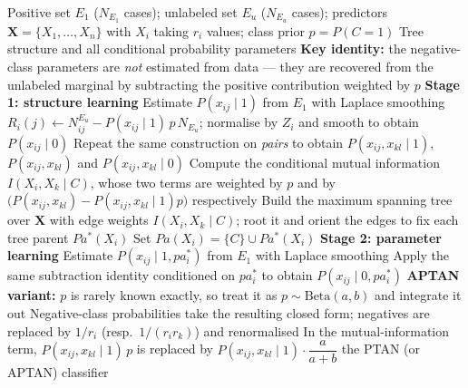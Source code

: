 \documentclass{article}
\begin{document}
\begin{algorithm}[!h]
\renewcommand{\algorithmicrequire}{\textbf{Input:}}
\renewcommand{\algorithmicensure}{\textbf{Output:}}
	\caption{PTAN (positive tree augmented naive Bayes), with the averaged variant APTAN}
	\begin{algorithmic}[1]
	    \REQUIRE
	    Positive set $E_{1}$ ($N_{E_{1}}$ cases); unlabeled set $E_{u}$ ($N_{E_{u}}$ cases);
	    predictors $\mathbf{X}=\{X_{1},\dots,X_{n}\}$ with $X_{i}$ taking $r_{i}$ values;
	    class prior $p=P(C=1)$
	    \ENSURE
	    Tree structure and all conditional probability parameters
	    \STATE \textbf{Key identity:} the negative-class parameters are \emph{not} estimated from
	    data --- they are recovered from the unlabeled marginal by subtracting the positive
	    contribution weighted by $p$ %
	    \STATE \textbf{Stage 1: structure learning}
	    \STATE Estimate $P(x_{ij}\mid 1)$ from $E_{1}$ with Laplace smoothing
	    \STATE $R_{i}(j)\leftarrow N_{ij}^{E_{u}}-P(x_{ij}\mid 1)\,p\,N_{E_{u}}$;\quad
	    normalise by $Z_{i}$ and smooth to obtain $P(x_{ij}\mid 0)$ %
	    \STATE Repeat the same construction on \emph{pairs} to obtain
	    $P(x_{ij},x_{kl}\mid 1)$, $P(x_{ij},x_{kl})$ and $P(x_{ij},x_{kl}\mid 0)$
	    \STATE Compute the conditional mutual information $I(X_{i},X_{k}\mid C)$, whose two terms
	    are weighted by $p$ and by $\big(P(x_{ij},x_{kl})-P(x_{ij},x_{kl}\mid 1)p\big)$ respectively
	    \STATE Build the maximum spanning tree over $\mathbf{X}$ with edge weights
	    $I(X_{i},X_{k}\mid C)$; root it and orient the edges to fix each tree parent $Pa^{\ast}(X_{i})$ %
	    \STATE Set $Pa(X_{i})=\{C\}\cup Pa^{\ast}(X_{i})$
	    \STATE \textbf{Stage 2: parameter learning}
	    \STATE Estimate $P(x_{ij}\mid 1,pa_{i}^{\ast})$ from $E_{1}$ with Laplace smoothing
	    \STATE Apply the same subtraction identity conditioned on $pa_{i}^{\ast}$ to obtain
	    $P(x_{ij}\mid 0,pa_{i}^{\ast})$ %
	    \STATE \textbf{APTAN variant:} $p$ is rarely known exactly, so treat it as
	    $p\sim\mathrm{Beta}(a,b)$ and integrate it out
	    \STATE \quad Negative-class probabilities take the resulting closed form; negatives are
	    replaced by $1/r_{i}$ (resp.\ $1/(r_{i}r_{k})$) and renormalised %
	    \STATE \quad In the mutual-information term, $P(x_{ij},x_{kl}\mid 1)\,p$ is replaced by
	    $P(x_{ij},x_{kl}\mid 1)\cdot\dfrac{a}{a+b}$ %
		\RETURN the PTAN (or APTAN) classifier
	\end{algorithmic}
\end{algorithm}
\end{document}
